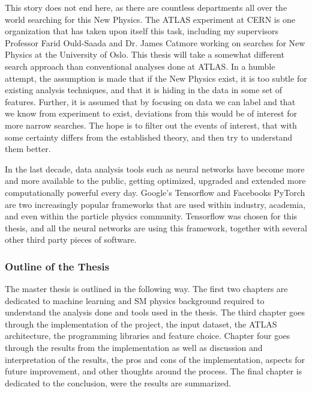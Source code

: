 This story does not end here, as there are countless departments all 
over the world searching for this New Physics. The ATLAS experiment at CERN is one organization that 
has taken upon itself this task, including my supervisors Professor Farid Ould-Saada and 
Dr. James Catmore working on searches for New Physics at the University of Oslo. This thesis will take a somewhat different search 
approach than conventional analyses done at ATLAS. In a humble attempt, the assumption is made that 
if the New Physics exist, it is too subtle for existing analysis techniques, and that it is hiding in the data
in some set of features. Further, it is assumed that by focusing on data we can label and that we know 
from experiment to exist, deviations from this would be of interest for more narrow searches. The hope is 
to filter out the events of interest, that with some certainty differs from the established theory, 
and then try to understand them better. \par 
In the last decade, data analysis tools such as neural networks have become more and more available 
to the public, getting optimized, upgraded and extended more computationally powerful every 
day. Google's Tensorflow\cite{tensorflow-whitepaper} and Facebooks PyTorch\cite{paszkepytorch} 
are two increasingly popular frameworks that are used within industry, 
academia, and even within the particle physics community. Tensorflow was chosen for this thesis, and 
all the neural networks are using this framework, together with several other third party pieces of software. \par 

\subsubsection*{Outline of the Thesis}
The master thesis is outlined in the following way. The first two chapters are dedicated to machine learning and
SM physics background required to understand the analysis done and tools used in the thesis. The third chapter goes 
through the implementation of the project, the input dataset, the ATLAS architecture, the programming libraries and
feature choice. Chapter four goes through the results from the implementation as well as discussion and 
interpretation of the results, the pros and cons of the implementation, aspects for future improvement, and other thoughts around the process.
The final chapter is dedicated to the conclusion, were the results are summarized. 


